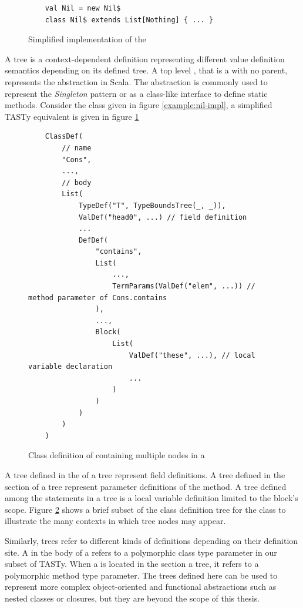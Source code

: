 \begin{figure}[!htb]
	\begin{verbatim}
	val Nil = new Nil$
	class Nil$ extends List[Nothing] { ... }
	\end{verbatim} 
	\caption{Simplified implementation of the }
	\label{example:decomp-object}
\end{figure}

A  tree is a context-dependent definition representing different value definition semantics depending on its defined tree.
A top level , that is a  with no parent, represents the  abstraction in Scala.
The  abstraction is commonly used to represent the \textit{Singleton} pattern\cite{go4:design-patterns} or as a class-like interface to define static methods.
Consider the  class given in figure \ref{example:nil-impl}, a simplified TASTy equivalent is given in figure \ref{example:decomp-object}

\begin{figure}[!htb]
	\begin{verbatim}
	ClassDef(
		// name 
		"Cons",
		...,
		// body
		List(
			TypeDef("T", TypeBoundsTree(_, _)),
			ValDef("head0", ...) // field definition
			...
			DefDef(
				"contains",
				List(
					...,
					TermParams(ValDef("elem", ...)) // method parameter of Cons.contains
				),
				...,
				Block(
					List(
						ValDef("these", ...), // local variable declaration		
						...
					)
				)
			)
		)
	)
	\end{verbatim} 
	\caption{Class definition of  containing multiple  nodes in a }
	\label{example:many-valdefs}
\end{figure}

A  tree defined in the  of a  tree represent field definitions.
A  tree defined in the  section of a  tree represent parameter definitions of the method.
A  tree defined among the statements in a  tree is a local variable definition limited to the block's scope.
Figure \ref{example:many-valdefs} shows a brief subset of the class definition tree for the  class to illustrate the many contexts in which  tree nodes may appear.

Similarly,  trees refer to different kinds of definitions depending on their definition site.
A  in the body of a  refers to a polymorphic class type parameter in our subset of TASTy.
When a  is located in the  section a  tree, it refers to a polymorphic method type parameter.
The trees defined here can be used to represent more complex object-oriented and functional abstractions such as nested classes or closures, but they are beyond the scope of this thesis.

